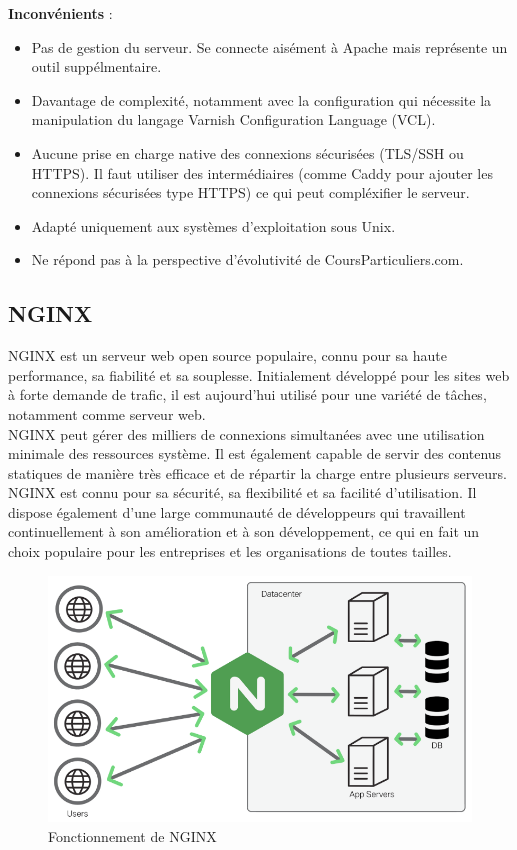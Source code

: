 \documentclass{article}
\begin{document}
{\bf Inconvénients} :\\
\begin{itemize}
    \item Pas de gestion du serveur. Se connecte aisément à Apache mais représente un outil suppélmentaire.
    \item Davantage de complexité, notamment avec la configuration qui nécessite la manipulation du langage Varnish Configuration Language (VCL).
    \item  Aucune prise en charge native des connexions sécurisées (TLS/SSH ou HTTPS). Il faut utiliser des intermédiaires (comme Caddy pour ajouter les connexions sécurisées type HTTPS) ce qui peut compléxifier le serveur.
    \item Adapté uniquement aux systèmes d’exploitation sous Unix.
    \item Ne répond pas à la perspective d'évolutivité de CoursParticuliers.com.
 
\end{itemize}


\subsection{NGINX}

NGINX est un serveur web open source populaire, connu pour sa haute performance, sa fiabilité et sa souplesse. Initialement développé pour les sites web à forte demande de trafic, il est aujourd'hui utilisé pour une variété de tâches, notamment comme serveur web.\\

NGINX peut gérer des milliers de connexions simultanées avec une utilisation minimale des ressources système. Il est également capable de servir des contenus statiques de manière très efficace et de répartir la charge entre plusieurs serveurs.\\

NGINX est connu pour sa sécurité, sa flexibilité et sa facilité d'utilisation. Il dispose également d'une large communauté de développeurs qui travaillent continuellement à son amélioration et à son développement, ce qui en fait un choix populaire pour les entreprises et les organisations de toutes tailles.
\begin{figure}[h]
    \centering
    \includegraphics[scale=0.4]{NGINX.png}
    \caption{Fonctionnement de NGINX}
    \label{fig:NGINX-schema}
\end{figure}
\end{document}
